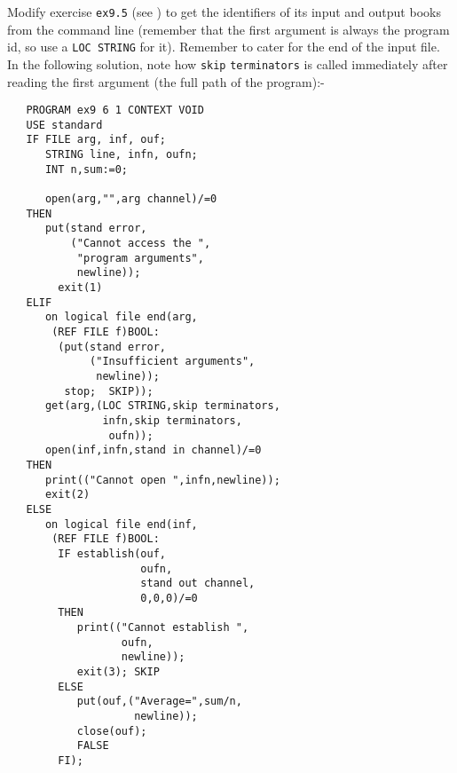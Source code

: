 \begin{exercise}
\item Modify exercise \verb|ex9.5| (see ) to
get the identifiers of its input and output books from the command
line (remember that the first argument is always the program id, so
use a \verb|LOC STRING| for it).  Remember to cater for the end of
the input file. \ans In the following solution, note how
\texttt{skip} \texttt{terminators} is called immediately after
reading the first argument (the full path of the program):-
\begin{verbatim}
   PROGRAM ex9 6 1 CONTEXT VOID
   USE standard
   IF FILE arg, inf, ouf;
      STRING line, infn, oufn;
      INT n,sum:=0;

      open(arg,"",arg channel)/=0
   THEN
      put(stand error,
          ("Cannot access the ",
           "program arguments",
           newline));
        exit(1)
   ELIF
      on logical file end(arg,
       (REF FILE f)BOOL:
        (put(stand error,
             ("Insufficient arguments",
              newline));
         stop;  SKIP));
      get(arg,(LOC STRING,skip terminators,
               infn,skip terminators,
                oufn));
      open(inf,infn,stand in channel)/=0
   THEN
      print(("Cannot open ",infn,newline));
      exit(2)
   ELSE
      on logical file end(inf,
       (REF FILE f)BOOL:
        IF establish(ouf,
                     oufn,
                     stand out channel,
                     0,0,0)/=0
        THEN
           print(("Cannot establish ",
                  oufn,
                  newline));
           exit(3); SKIP
        ELSE
           put(ouf,("Average=",sum/n,
                    newline));
           close(ouf);
           FALSE
        FI);


\end{verbatim}
\end{exercise}
